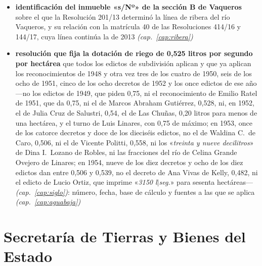 \begin{itemize}[leftmargin=*]
\item \textbf{identificación del inmueble «s/Nº» de la sección B de Vaqueros} sobre el que la Resolución 201/13 determinó la línea de ribera del río Vaqueros, y su relación con la matrícula 40 de las Resoluciones 414/16 y 144/17, cuya línea continúa la de 2013 \textit{(cap.\ \ref{cap:ribera})}
\item \textbf{resolución que fija la dotación de riego de 0,525 litros por segundo por hectárea} que todos los edictos de subdivisión aplican y que ya aplican los reconocimientos de 1948 y otra vez tres de los cuatro de 1950, seis de los ocho de 1951, cinco de los ocho decretos de 1952 y los once edictos de ese año ---no los edictos de 1949, que piden 0,75, ni el reconocimiento de Emilio Ratel de 1951, que da 0,75, ni el de Marcos Abraham Gutiérrez, 0,528, ni, en 1952, el de Julia Cruz de Salustri, 0,54, el de Las Chuñas, 0,20 litros para menos de una hectárea, y el turno de Luis Linares, con 0,75 de máximo; en 1953, once de los catorce decretos y doce de los dieciséis edictos, no el de Waldina C.\ de Caro, 0,506, ni el de Vicente Politti, 0,558, ni los «\textit{treinta y nueve decilitros}» de Dina I.\ Lozano de Robles, ni las fracciones del río de Celina Grande Ovejero de Linares; en 1954, nueve de los diez decretos y ocho de los diez edictos dan entre 0,506 y 0,539, no el decreto de Ana Vivas de Kelly, 0,482, ni el edicto de Lucio Ortiz, que imprime «\textit{3150 l$|$seg.}» para sesenta hectáreas--- \textit{(cap.\ \ref{cap:siglo})}: número, fecha, base de cálculo y fuentes a las que se aplica \textit{(cap.\ \ref{cap:aguabaja})}
\end{itemize}

\section{Secretaría de Tierras y Bienes del Estado}

